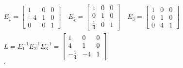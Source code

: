 \documentclass{zc-ust-hw}
\begin{document}
\begin{enumerate}
\begin{enumerate}
\begin{sol}
\begin{gather}
            E_1 = \begin{bmatrix} 1 & 0 & 0 \\ -4 & 1 & 0 \\ 0 & 0 & 1 \end{bmatrix} \quad E_2 = \begin{bmatrix} 1 & 0 & 0 \\ 0 & 1 & 0 \\ \frac{1}{4} & 0 & 1 \end{bmatrix} \quad E_3 = \begin{bmatrix} 1 & 0 & 0 \\ 0 & 1 & 0 \\ 0 & 4 & 1 \end{bmatrix} \\
            L = E_1^{-1}E_2^{-1}E_3^{-1} = \begin{bmatrix} 1 & 0 & 0 \\ 4 & 1 & 0 \\ -\frac{1}{4} & -4 & 1 \end{bmatrix} \\
          .\end{gather}
        \end{sol}

    \end{enumerate}


\end{enumerate}
\end{document}
